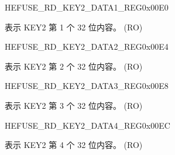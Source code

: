 \begin{register}{H}{EFUSE\_RD\_KEY2\_DATA1\_REG}{0x{}00E0}\label{regdesc:EFUSERDKEY2DATA1REG}
%
\regnewline%
\begin{regdesc}\begin{reglist}
\label{fielddesc:EFUSEKEY2DATA1}\item [EFUSE\_KEY2\_DATA1] 表示 KEY2 第 1 个 32 位内容。 (RO)
\end{reglist}\end{regdesc}
\end{register}


\begin{register}{H}{EFUSE\_RD\_KEY2\_DATA2\_REG}{0x{}00E4}\label{regdesc:EFUSERDKEY2DATA2REG}
%
\regnewline%
\begin{regdesc}\begin{reglist}
\label{fielddesc:EFUSEKEY2DATA2}\item [EFUSE\_KEY2\_DATA2] 表示 KEY2 第 2 个 32 位内容。 (RO)
\end{reglist}\end{regdesc}
\end{register}


\begin{register}{H}{EFUSE\_RD\_KEY2\_DATA3\_REG}{0x{}00E8}\label{regdesc:EFUSERDKEY2DATA3REG}
%
\regnewline%
\begin{regdesc}\begin{reglist}
\label{fielddesc:EFUSEKEY2DATA3}\item [EFUSE\_KEY2\_DATA3] 表示 KEY2 第 3 个 32 位内容。 (RO)
\end{reglist}\end{regdesc}
\end{register}


\begin{register}{H}{EFUSE\_RD\_KEY2\_DATA4\_REG}{0x{}00EC}\label{regdesc:EFUSERDKEY2DATA4REG}
%
\regnewline%
\begin{regdesc}\begin{reglist}
\label{fielddesc:EFUSEKEY2DATA4}\item [EFUSE\_KEY2\_DATA4] 表示 KEY2 第 4 个 32 位内容。 (RO)
\end{reglist}\end{regdesc}
\end{register}


